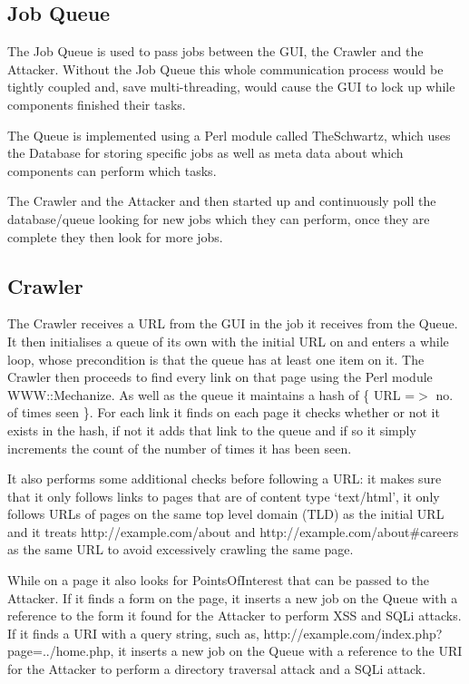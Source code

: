 \documentclass[12pt,a4paper]{article}
\begin{document}
\subsection{Job Queue}
The Job Queue is used to pass jobs between the GUI, the Crawler and the Attacker.  Without the Job Queue this whole communication process would be tightly coupled and, save multi-threading, would cause the GUI to lock up while components finished their tasks.

The Queue is implemented using a Perl module called TheSchwartz, which uses the Database for storing specific jobs as well as meta data about which components can perform which tasks.

The Crawler and the Attacker and then started up and continuously poll the database/queue looking for new jobs which they can perform, once they are complete they then look for more jobs.

\subsection{Crawler}
The Crawler receives a URL from the GUI in the job it receives from the Queue.  It then initialises a queue of its own with the initial URL on and enters a while loop, whose precondition is that the queue has at least one item on it.  The Crawler then proceeds to find every link on that page using the Perl module WWW::Mechanize.  As well as the queue it maintains a hash of \{ URL =$>$ no. of times seen \}.  For each link it finds on each page it checks whether or not it exists in the hash, if not it adds that link to the queue and if so it simply increments the count of the number of times it has been seen.

It also performs some additional checks before following a URL: it makes sure that it only follows links to pages that are of content type `text/html',  it only follows URLs of pages on the same top level domain (TLD) as the initial URL and it treats http://example.com/about and http://example.com/about\#careers as the same URL to avoid excessively crawling the same page.

While on a page it also looks for PointsOfInterest that can be passed to the Attacker.  If it finds a form on the page, it inserts a new job on the Queue with a reference to the form it found for the Attacker to perform XSS and SQLi attacks.  If it finds a URI with a query string, such as, http://example.com/index.php?page=../home.php, it inserts a new job on the Queue with a reference to the URI for the Attacker to perform a directory traversal attack and a SQLi attack.
\end{document}
